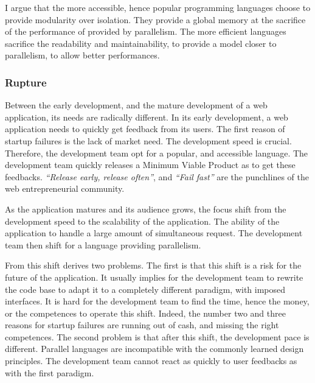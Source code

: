 I argue that the more accessible, hence popular programming languages choose to provide modularity over isolation.
They provide a global memory at the sacrifice of the performance of provided by parallelism.
The more efficient languages sacrifice the readability and maintainability, to provide a model closer to parallelism, to allow better performances.

\subsubsection{Rupture}

Between the early development, and the mature development of a web application, its needs are radically different.
In its early development, a web application needs to quickly get feedback from its users.
The first reason of startup failures is the lack of market need.
The development speed is crucial.
Therefore, the development team opt for a popular, and accessible language.
The development team quickly releases a Minimum Viable Product as to get these feedbacks.
\textit{``Release early, release often''}, and \textit{``Fail fast''} are the punchlines of the web entrepreneurial community.

As the application matures and its audience grows, the focus shift from the development speed to the scalability of the application.
The ability of the application to handle a large amount of simultaneous request.
The development team then shift for a language providing parallelism.

From this shift derives two problems.
The first is that this shift is a risk for the future of the application.
It usually implies for the development team to rewrite the code base to adapt it to a completely different paradigm, with imposed interfaces.
It is hard for the development team to find the time, hence the money, or the competences to operate this shift.
Indeed, the number two and three reasons for startup failures are running out of cash, and missing the right competences.
The second problem is that after this shift, the development pace is different.
Parallel languages are incompatible with the commonly learned design principles.
The development team cannot react as quickly to user feedbacks as with the first paradigm.


